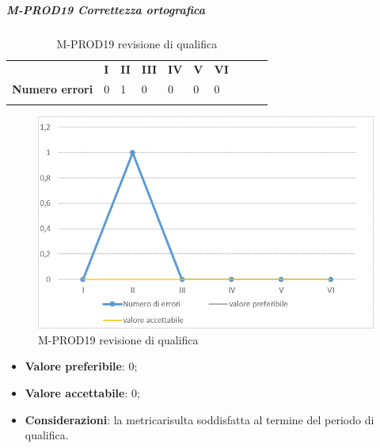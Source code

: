 \subparagraph{M-PROD19 Correttezza ortografica} \mbox{}
\begin{longtable}[H!] {						
		>{}p{50mm}  		
		>{}p{8mm}
		>{}p{8mm}		
		>{}p{8mm}		
		>{}p{8mm}		
		>{}p{8mm}		
		>{}p{8mm}
		>{}p{8mm}
		>{}p{8mm}
		>{}p{8mm}
	}
	\rowcolor{gray!50}
	\textbf{} & \textbf{I} & \textbf{II} & \textbf{III} & \textbf{IV} & \textbf{V} & \textbf{VI} \TBstrut \\ [2mm]
	\textbf{Numero errori} & 0 & 1 & 0 & 0 & 0 & 0 \TBstrut \\ [2mm]
	\rowcolor{white}
	\caption{M-PROD19 revisione di qualifica}
\end{longtable}
\begin{figure}[H] 	
	\includegraphics[width=\linewidth]{./img/grafici/RQ19.png}	
	\caption{M-PROD19 revisione di qualifica}	
\end{figure}
\begin{itemize}
	\item \textbf{Valore preferibile}: 0;
	\item \textbf{Valore accettabile}: 0;
	\item \textbf{Considerazioni}: la metrica\glosp risulta soddisfatta al termine del periodo di qualifica.
\end{itemize}


